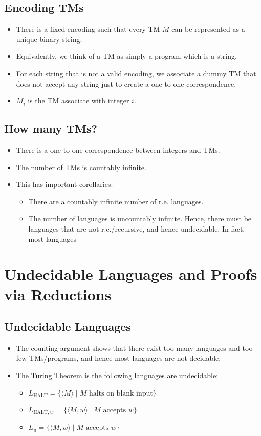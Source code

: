 \documentclass[12pt]{article}
\begin{document}
\subsection{Encoding TMs}
\begin{itemize}
    \item There is a fixed encoding such that every TM $M$ can be represented as a unique binary string.
    \item Equivalently, we think of a TM as simply a program which is a string.
    \item For each string that is not a valid encoding, we associate a dummy TM that does not accept any string just to create a one-to-one correspondence.
    \item $M_i$ is the TM associate with integer $i$.
\end{itemize}

\subsection{How many TMs?}
\begin{itemize}
    \item There is a one-to-one correspondence between integers and TMs.
    \item The number of TMs is countably infinite.
    \item This has important corollaries:
    \begin{itemize}
        \item There are a countably infinite number of r.e. languages.
        \item The number of languages is uncountably infinite. Hence, there must be languages that are not r.e./recursive, and hence undecidable. In fact, most languages 
    \end{itemize}
\end{itemize}

\section{Undecidable Languages and Proofs via Reductions}

\subsection{Undecidable Languages}
\begin{itemize}
    \item The counting argument shows that there exist too many languages and too few TMs/programs, and hence most languages are not decidable.
    \item The Turing Theorem is the following languages are undecidable:
    \begin{itemize}
        \item $L_{\text{HALT}} = \{ \langle M \rangle \mid \text{$M$ halts on blank input} \}$
        \item $L_{\text{HALT}, w} = \{ \langle M, w \rangle \mid \text{$M$ accepts $w$} \}$
        \item $L_u = \{ \langle M, w \rangle \mid \text{$M$ accepts $w$} \}$
    \end{itemize}
\end{itemize}
\end{document}

